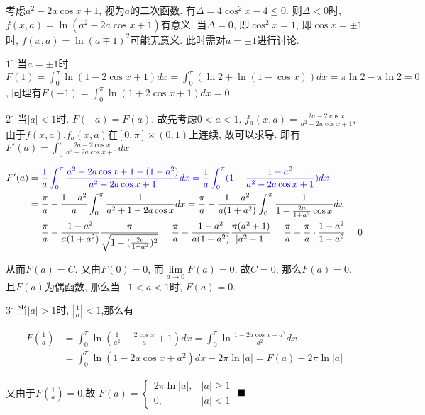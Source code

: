 \documentclass[lang=cn,newtx,10pt,scheme=chinese]{elegantbook}
\begin{document}
\begin{solution}[解法1]


\begin{remark}
考虑$a^2-2a\cos x+1$, 视为$a$的二次函数.
有$\Delta=4\cos^2x-4 \le 0$. 则$\Delta < 0$时, $f(x,a)=\ln(a^2-2a\cos x+1)$有意义.
当$\Delta=0$, 即$\cos^2x=1$, 即$\cos x=\pm 1$时, $f(x,a)=\ln(a\mp 1)^2$可能无意义.
此时需对$a=\pm 1$进行讨论.
\end{remark}

$1^\circ$ 当$a=\pm 1$时
$F(1) = \int_{0}^{\pi}\ln(1-2\cos x+1)dx = \int_{0}^{\pi}(\ln 2+\ln(1-\cos x))dx = \pi\ln2 - \pi\ln2=0$,
同理有$F(-1) = \int_{0}^{\pi}\ln(1+2\cos x+1)dx=0$

$2^\circ$ 当$|a|<1$时. $F(-a)=F(a)$. 故先考虑$0<a<1$.
$f_a(x,a) = \frac{2a-2\cos x}{a^2-2a\cos x+1}$,由于$f(x,a)$,$f_a(x,a)$在$[0,\pi] \times (0,1)$上连续, 故可以求导.
即有$F'(a)=\int_{0}^{\pi}\frac{2a-2\cos x}{a^2-2a\cos x+1}dx$

\begin{align*}
    F'(a) &= \color{blue}{\frac{1}{a}\int_{0}^{\pi}\frac{a^2-2a\cos x+1-(1-a^2)}{a^2-2a\cos x+1}dx = \frac{1}{a}\int_{0}^{\pi}(1-\frac{1-a^2}{a^2-2a\cos x+1})dx}\\
          &= \frac{\pi}{a} - \frac{1-a^2}{a}\int_{0}^{\pi}\frac{1}{a^2+1-2a\cos x}dx = \frac{\pi}{a} - \frac{1-a^2}{a(1+a^2)}\int_{0}^{\pi}\frac{1}{1-\frac{2a}{1+a^2}\cos x}dx \\
          &= \frac{\pi}{a} - \frac{1-a^2}{a(1+a^2)}\frac{\pi}{\sqrt{1-(\frac{2a}{1+a^2})^2}} = \frac{\pi}{a} - \frac{1-a^2}{a(1+a^2)}\frac{\pi(a^2+1)}{|a^2-1|} = \frac{\pi}{a} - \frac{\pi}{a}\cdot\frac{1-a^2}{1-a^2} = 0
\end{align*}

从而$F(a)=C$. 又由$F(0)=0$, 而$\lim\limits_{a\to 0}F(a)=0$, 故$C=0$, 那么$F(a)=0$.
且$F(a)$为偶函数, 那么当$-1<a<1$时, $F(a)=0$.

$3^\circ$ 当$|a|>1$时, $|\frac{1}{a}|<1$,那么有

\begin{align*}
F(\frac{1}{a}) &= \int_{0}^{\pi}\ln\left(\frac{1}{a^2}-\frac{2\cos x}{a}+1\right)dx = \int_{0}^{\pi}\ln\frac{1-2a\cos x+a^2}{a^2}dx \\
&= \int_{0}^{\pi}\ln(1-2a\cos x+a^2)dx - 2\pi\ln|a| = F(a)-2\pi\ln|a|
\end{align*}

又由于$F(\frac{1}{a}) = 0 $,故 $F(a) = \begin{cases} 2\pi\ln|a|, & |a| \geq  1 \\ 0, & |a|<  1 \end{cases}$
$\hfill \blacksquare$
\end{solution}
\end{document}
